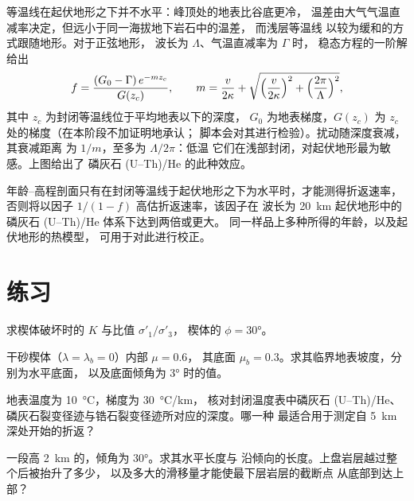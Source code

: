 等温线在起伏地形之下并不水平：峰顶处的地表比谷底更冷，
温差由大气气温直减率决定，但远小于同一海拔地下岩石中的温差，
而浅层等温线
以较为缓和的方式跟随地形。对于正弦地形，
波长为 $\Lambda$、气温直减率为 $\Gamma$ 时，
稳态方程的一阶解给出
\[
  f = \frac{(G_0 - \Gamma)\,e^{-mz_c}}{G(z_c)},\qquad
  m = \frac{v}{2\kappa} + \sqrt{\Bigl(\frac{v}{2\kappa}\Bigr)^2 +
  \Bigl(\frac{2\pi}{\Lambda}\Bigr)^2},
\]
其中 $z_c$ 为封闭等温线位于平均地表以下的深度，
$G_0$ 为地表梯度，$G(z_c)$ 为 $z_c$ 处的梯度（在本阶段不加证明地承认；
脚本会对其进行检验）。扰动随深度衰减，其衰减距离
为 $1/m$，至多为 $\Lambda/2\pi$：低温
它们在浅部封闭，对起伏地形最为敏感。上图给出了
磷灰石 (U--Th)/He 的此种效应。

年龄–高程剖面只有在封闭等温线于起伏地形之下为水平时，才能测得折返速率，
否则将以因子 $1/(1 - f)$ 高估折返速率，该因子在
波长为 \qty{20}{km} 起伏地形中的磷灰石 (U--Th)/He 体系下达到两倍或更大。
同一样品上多种所得的年龄，以及起伏地形的热模型，
可用于对此进行校正。

\section{练习}

\begin{exercise}[$\star$]\label{exo:b3:orogenic-wedges:1}
求楔体破坏时的 $K$ 与比值 $\sigma'_1/\sigma'_3$，
楔体的 $\phi = \ang{30}$。
\end{exercise}

\begin{exercise}[$\star$]\label{exo:b3:orogenic-wedges:2}
干砂楔体（$\lambda = \lambda_b = 0$）内部 $\mu = 0.6$，
其底面 $\mu_b = 0.3$。求其临界地表坡度，分别为水平底面，
以及底面倾角为 \ang{3} 时的值。
\end{exercise}

\begin{exercise}[$\star$]\label{exo:b3:orogenic-wedges:3}
地表温度为 \qty{10}{\celsius}，梯度为 \qty{30}{\celsius/km}，
核对封闭温度表中磷灰石 (U--Th)/He、
磷灰石裂变径迹与锆石裂变径迹所对应的深度。哪一种
最适合用于测定自 \qty{5}{km} 深处开始的折返？
\end{exercise}

\begin{exercise}[$\star$]\label{exo:b3:orogenic-wedges:4}
一段高 \qty{2}{km} 的，倾角为 \ang{30}。求其水平长度与
沿倾向的长度。上盘岩层越过整个后被抬升了多少，
以及多大的滑移量才能使最下层岩层的截断点
从底部到达上部？
\end{exercise}

